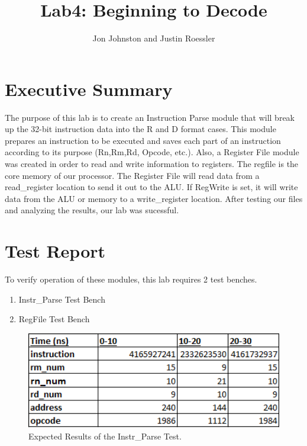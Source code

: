 \documentclass{article}
\author{Jon Johnston and Justin Roessler}
\title{Lab4: Beginning to Decode}
\begin{document}
\maketitle

\section{Executive Summary}
The purpose of this lab is to create an Instruction Parse module that will break up the 32-bit instruction data into the R and D format cases. This module prepares an instruction to be executed and saves each part of an instruction according to its purpose (Rn,Rm,Rd, Opcode, etc.). Also, a Register File module was created in order to read and write information to registers. The regfile is the core memory of our processor. The Register File will read data from a read\_register location to send it out to the ALU. If RegWrite is set, it will write data from the ALU or memory to a write\_register location. After testing our files and analyzing the results, our lab was sucessful.
	

\section{Test Report}
To verify operation of these modules, this lab requires 2 test benches. 
\begin{enumerate}
	\item Instr\_Parse Test Bench
	\item RegFile Test Bench
\end{enumerate}


\pagebreak

\begin{figure}[H]
	\begin{center}
		\caption{Expected Results of the Instr\_Parse Test.}\label{fig:ert_Intsr_Parse_Test}
		\includegraphics[width=1.0\textwidth]{../images/Instr_ParseExpected.png}
	\end{center}
\end{figure}
\end{document}
